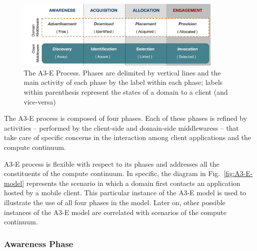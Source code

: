 \begin{figure}[tbp]
	\includegraphics[width=0.9\textwidth]{figs/A3-E-process}
	\caption{The A3-E Process. Phases are delimited by vertical lines and the main activity of each phase by the label within each phase; labels within parenthesis represent the states of a domain to a client (and vice-versa)}
	\label{fig:A3-E-process}
\end{figure}

The A3-E process is composed of four phases. Each of these phases is refined by activities -- performed by the client-side and domain-side middlewaress -- that take care of specific concerns in the interaction among client applications and the compute continuum.

A3-E process is flexible with respect to its phases and addresses all the constituents of the compute continuum. In specific, the diagram in Fig.~\ref{fig:A3-E-model} represents the scenario in which a domain first contacts an application hosted by a mobile client. This particular instance of the A3-E model is used to illustrate the use of all four phases in the model. Later on, other possible instances of the A3-E model are correlated with scenarios of the compute continuum.


\subsubsection*{Awareness Phase}\label{sec:A3-E-awareness}


